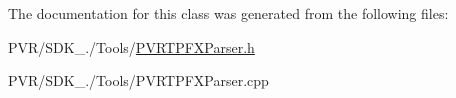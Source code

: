 The documentation for this class was generated from the following files\+:\begin{DoxyCompactItemize}
\item 
P\+V\+R/\+S\+D\+K\+\_./\+Tools/\hyperlink{_p_v_r_t_p_f_x_parser_8h}{P\+V\+R\+T\+P\+F\+X\+Parser.\+h}\item 
P\+V\+R/\+S\+D\+K\+\_./\+Tools/P\+V\+R\+T\+P\+F\+X\+Parser.\+cpp\end{DoxyCompactItemize}
